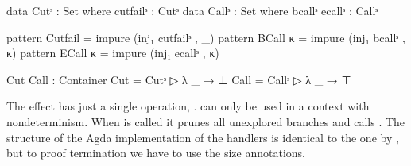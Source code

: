 \begin{code}
data Cutˢ : Set where cutfailˢ : Cutˢ
data Callˢ : Set where bcallˢ ecallˢ : Callˢ

pattern Cutfail = impure (inj₁ cutfailˢ , _)
pattern BCall κ = impure (inj₁ bcallˢ , κ)
pattern ECall κ = impure (inj₁ ecallˢ , κ)

Cut Call : Container
Cut   = Cutˢ    ▷ λ _ → ⊥
Call  = Callˢ   ▷ λ _ → ⊤
\end{code}
The  effect has just a single operation, .
 can only be used in a context with nondeterminism.
When  is called it prunes all unexplored branches and
calls .
The structure of the Agda implementation of the handlers is identical to the one
by \textcite{DBLP:conf/haskell/WuSH14}, but to proof termination we have to use
the size annotations.

